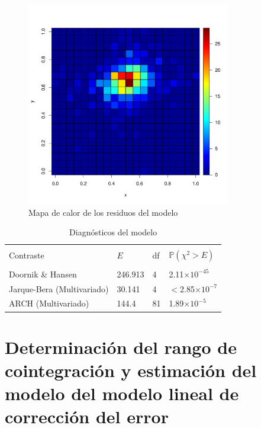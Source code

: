 \documentclass[12pt, twoside]{book}\usepackage[]{graphicx}\usepackage[]{color}
\newenvironment{knitrout}{}{} %
\numberwithin{equation}{section}
\numberwithin{theorem}{section}
\numberwithin{teorema}{section}
\numberwithin{defi}{section}
\numberwithin{prop}{section}
\numberwithin{defi}{section}
\theoremstyle{plain}
\begin{document}
\begin{knitrout}
\color{fgcolor}\begin{figure}[H]

{\centering \includegraphics[width=3.5in,height=3.5in]{figure/fig-5_3_2-1} 

}

\caption[Mapa de calor de los residuos del modelo]{Mapa de calor de los residuos del modelo}\label{fig:fig-5.3.2}
\end{figure}


\end{knitrout}




\begin{table}[!htpb]
\centering
\caption{Diagnósticos del modelo}
\begin{tabular}{@{}llll@{}}
\toprule \\ 
Contraste   & $E$ & df & $\mathbb{P}(\chi^{2}>E)$ \\
\midrule \\ 
Doornik \& Hansen & 246.913 & 4 & 2.11$\times 10^{-45}$ \\
Jarque-Bera (Multivariado) & 30.141 & 4 & $<$2.85$\times 10^{-7}$ \\
ARCH (Multivariado) & 144.4 & 81 & 1.89$\times 10^{-5}$ \\ 
\bottomrule 
\end{tabular}
\end{table}

\section{Determinación del rango de cointegración y estimación del modelo del modelo lineal de corrección del error}
\end{document}
